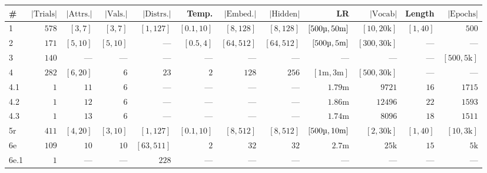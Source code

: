 \begin{table}
  \newcommand\dit{---}
  \centering
  \footnotesize
  \setlength\tabcolsep{0.2em}
  \begin{tabular}{lrrrrrrrrrrr}
    \toprule
    \# & $|\text{Trials}|$ & $|\text{Attrs.}|$ & $|\text{Vals.}|$ & $|\text{Distrs.}|$ & Temp. & $|\text{Embed.}|$ & $|\text{Hidden}|$ & LR & $|\text{Vocab}|$ & Length & $|\text{Epochs}|$ \\
    \midrule
    1    & $578$ & $[3,7]$  &  $[3,7]$ & $[1,127]$  & $[0.1, 10]$ & $[8,128]$  & $[8,128]$  & $[500\text{\textmu},50\text{m}]$ & $[10,20\text{k}]$  & $[1,40]$ & $500$             \\
    2    & $171$ & $[5,10]$ & $[5,10]$ & \dit{}     &  $[0.5, 4]$ & $[64,512]$ & $[64,512]$ & $[500\text{\textmu},5\text{m}]$  & $[300,30\text{k}]$ & \dit{}   & \dit{}            \\
    3    & $140$ & \dit{}   &   \dit{} & \dit{}     & \dit{}      & \dit{}     & \dit{}     & \dit{}                           & \dit{}             & \dit{}   & $[500,5\text{k}]$ \\
    4    & $282$ & $[6,20]$ &      $6$ & $23$       & $2$         & $128$      & $256$      & $[1\text{m},3\text{m}]$          & $[500,30\text{k}]$ & \dit{}   & \dit{}            \\
    4.1  & $1$   & $11$     &      $6$ & \dit{}     & \dit{}      & \dit{}     & \dit{}     & $1.79\text{m}$                   & $9721$             & $16$     & $1715$            \\
    4.2  & $1$   & $12$     &      $6$ & \dit{}     & \dit{}      & \dit{}     & \dit{}     & $1.86\text{m}$                   & $12496$            & $22$     & $1593$            \\
    4.3  & $1$   & $13$     &      $6$ & \dit{}     & \dit{}      & \dit{}     & \dit{}     & $1.74\text{m}$                   & $8096$             & $18$     & $1511$            \\
    5r   & $411$ & $[4,20]$ & $[3,10]$ & $[1,127]$  & $[0.1,10]$  & $[8,512]$  & $[8,512]$  & $[500\text{\textmu},10\text{m}]$ & $[2,30\text{k}]$   & $[1,40]$ & $[10,3\text{k}]$  \\
    6e   & $109$ & $10$     &     $10$ & $[63,511]$ & $2$         & $32$       & $32$       & $2.7\text{m}$                    & $25\text{k}$       & $15$     & $5\text{k}$       \\
    6e.1 & $1$   & \dit{}   &   \dit{} & $228$      & \dit{}      & \dit{}     & \dit{}     & \dit{}                           & \dit{}             & \dit{}   & \dit{}            \\

\end{tabular}
\end{table}
